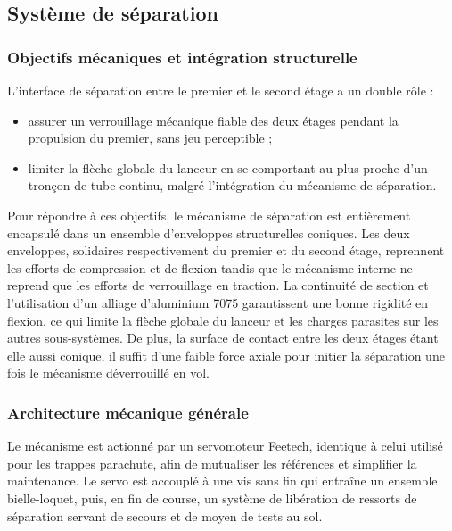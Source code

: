 \subsection{Système de séparation}
\label{subsec:sys_sepa}

\subsubsection{Objectifs mécaniques et intégration structurelle}

L'interface de séparation entre le premier et le second étage a un double rôle :
\begin{itemize}
    \item assurer un verrouillage mécanique fiable des deux étages pendant la propulsion du premier, sans jeu perceptible ;
    \item limiter la flèche globale du lanceur en se comportant au plus proche d'un tronçon de tube continu, malgré
    l'intégration du mécanisme de séparation.\\
\end{itemize}

Pour répondre à ces objectifs, le mécanisme de séparation est entièrement encapsulé dans un ensemble d'enveloppes structurelles
coniques. Les deux enveloppes, solidaires respectivement du premier et du second étage, reprennent les efforts de compression et
de flexion tandis que le mécanisme interne ne reprend que les efforts de verrouillage en traction. La continuité de section et
l'utilisation d'un alliage d'aluminium 7075 garantissent une bonne rigidité en flexion, ce qui limite la flèche globale du
lanceur et les charges parasites sur les autres sous-systèmes. De plus, la surface de contact entre les deux étages étant elle
aussi conique, il suffit d'une faible force axiale pour initier la séparation une fois le mécanisme déverrouillé en vol.

\subsubsection{Architecture mécanique générale}

Le mécanisme est actionné par un servomoteur Feetech, identique à celui utilisé pour les trappes parachute, afin de mutualiser les
références et simplifier la maintenance. Le servo est accouplé à une vis sans fin qui entraîne un ensemble bielle-loquet, puis,
en fin de course, un système de libération de ressorts de séparation servant de secours et de moyen de tests au sol.\\

